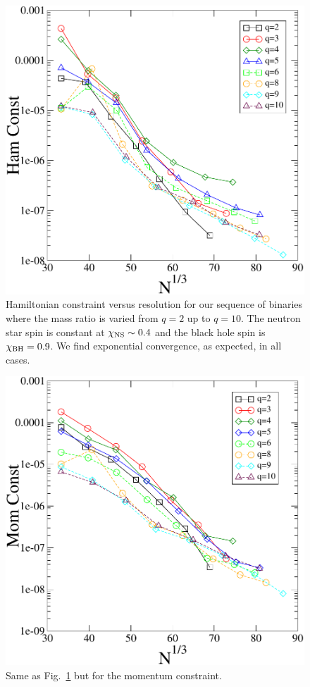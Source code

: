 \begin{figure}
\includegraphics[width=0.95\columnwidth]{chap4/qSeqHam}
\caption[Hamiltonian constraint for the $q$ sequence.]{\label{fig:qSeqHam}Hamiltonian constraint versus resolution for our sequence of binaries where the mass ratio is varied from $q=2$ up to $q=10$. The neutron star spin is constant at $\chi_{\rm NS}\sim 0.4$ and the black hole spin is $\chi_{\rm BH}=0.9$. We find exponential convergence, as expected, in all cases.}
\end{figure}

\begin{figure}
\includegraphics[width=0.95\columnwidth]{chap4/qSeqMom}
\caption[Momentum constraint for the $q$ sequence.]{\label{fig:qSeqMom} Same as Fig.~\ref{fig:qSeqHam}
  but for the momentum constraint.}
\end{figure}

